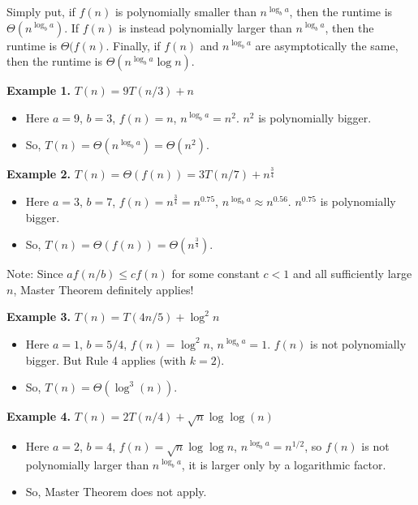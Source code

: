 \documentclass[a4paper,11pt]{book}
\begin{document}
\noindent Simply put, if $f(n)$ is polynomially smaller than $n^{\log_b{a}}$, then the runtime is $\Theta(n^{\log_ba})$. If $f(n)$ is instead polynomially larger than $n^{\log_b{a}}$, then the runtime is $\Theta(f(n)$. Finally, if $f(n)$ and $n^{\log_b{a}}$ are asymptotically the same, then the runtime is  $\Theta(n^{\log_ba} \log n)$.
\vspace{3mm}

\noindent \textbf{Example 1.} $T(n) = 9 T(n/3) + n$

\begin{itemize} 
\item Here $a = 9$, $b=3$, $f(n) = n$, $n^{\log_ba} = n^2$.  $n^2$ is
polynomially bigger.
\item So, $T(n) = \Theta(n^{\log_ba}) = \Theta(n^2)$.
\end{itemize}

\noindent \textbf{Example 2.} $T(n) = \Theta(f(n)) = 3 T(n/7) + n^{\frac{3}{4}}$

\begin{itemize} 
\item Here $a = 3$, $b=7$, $f(n) = n^{\frac{3}{4}} = n^{0.75}$,
$n^{\log_ba} \approx n^{0.56}$.  $n^{0.75}$ is polynomially bigger.
\item So, $T(n) = \Theta(f(n)) = \Theta(n^{\frac{3}{4}})$.
\end{itemize}

\noindent Note: Since $a f(n/b) \le c f(n)$ for some constant $c<1$ and all sufficiently large $n$, Master Theorem definitely applies!
\vspace{3mm}

\noindent \textbf{Example 3.} $T(n) = T(4n/5) + \log^2 n$

\begin{itemize} 
\item Here $a = 1$, $b=5/4$, $f(n) = \log^2 n$, $n^{\log_ba} =
1$. $f(n)$ is not polynomially bigger. But Rule 4 applies (with
$k=2$).
\item So, $T(n) = \Theta(\log^3(n))$.
\end{itemize}

\noindent \textbf{Example 4.} $T(n) = 2 T(n/4) + \sqrt{n} \log \log(n)$

\begin{itemize} 
\item Here $a = 2$, $b=4$, $f(n) = \sqrt{n}\log\log n$, $n^{\log_ba}
=n^{1/2}$, so $f(n)$ is not polynomially larger than  $n^{\log_ba}$, it is larger only by a logarithmic factor.
\item So, Master Theorem does not apply.
\end{itemize}
\end{document}

